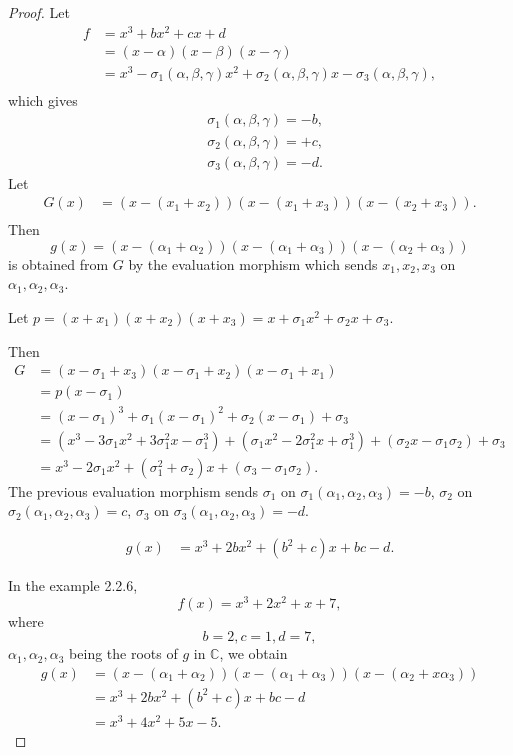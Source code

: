 \documentclass[11pt,a4paper]{article}
\begin{document}
\begin{proof}
Let
\begin{align*}
f &= x^3+bx^2+cx+d\\
&=( x-\alpha)(x-\beta)(x-\gamma)\\
&= x^3 - \sigma_1(\alpha,\beta,\gamma)x^2 + \sigma_2(\alpha,\beta,\gamma)x - \sigma_3(\alpha,\beta,\gamma),\\
\end{align*}
which gives
\begin{align*}
& \sigma_1(\alpha,\beta,\gamma) = -b,\\
& \sigma_2(\alpha,\beta,\gamma)=+c,\\
& \sigma_3(\alpha,\beta,\gamma)=-d.
\end{align*}
Let
\begin{align*}
G(x) &= (x -(x_1+x_2))(x-(x_1+x_3))(x-(x_2+x_3)).\\
\end{align*}
Then $$g(x) = (x -(\alpha_1+\alpha_2))(x-(\alpha_1+\alpha_3))(x-(\alpha_2+\alpha_3))$$ is obtained from $G$ by the evaluation morphism which sends $x_1,x_2,x_3$ on $\alpha_1,\alpha_2,\alpha_3$.

Let  $p = (x+x_1)(x+x_2)(x+x_3) = x+ \sigma_1x^2+\sigma_2 x +\sigma_3$.

Then
\begin{align*}
G &= (x - \sigma_1 + x_3)(x-\sigma_1+x_2)(x - \sigma_1 + x_1)\\
&=p(x-\sigma_1)\\
&=(x-\sigma_1)^3 + \sigma_1 (x-\sigma_1)^2 + \sigma_2(x-\sigma_1) + \sigma_3\\
&=(x^3 -3 \sigma_1 x^2 + 3 \sigma_1^2 x - \sigma_1^3) + (\sigma_1x^2 - 2 \sigma_1^2x + \sigma_1^3)+ (\sigma_2 x - \sigma_1 \sigma_2) + \sigma_3\\
&=x^3 - 2 \sigma_1 x^2 + (\sigma_1^2+\sigma_2)x + (\sigma_3 - \sigma_1\sigma_2).
\end{align*}
The previous  evaluation morphism sends $\sigma_1$ on $\sigma_1(\alpha_1,\alpha_2,\alpha_3)=-b$, 
$\sigma_2$ on $\sigma_2(\alpha_1,\alpha_2,\alpha_3)=c$, $\sigma_3$ on $\sigma_3(\alpha_1,\alpha_2,\alpha_3)=-d$.

\begin{align*}
g(x) &= x^3 +2bx^2+(b^2+c)x+bc-d.
\end{align*}

In the example 2.2.6, 
$$f(x) = x^3+2x^2+x+7,$$
where
$$b=2,c=1,d=7,$$
$\alpha_1,\alpha_2,\alpha_3$ being the roots of $g$ in $\mathbb{C}$,
we obtain
\begin{align*}
g(x) &= (x -(\alpha_1+\alpha_2))(x-(\alpha_1+\alpha_3))(x-(\alpha_2+x\alpha_3))\\
&=x^3 +2bx^2+(b^2+c)x+bc-d\\
&=x^3 + 4x^2+5x-5.
\end{align*}
\end{proof}
\end{document}
